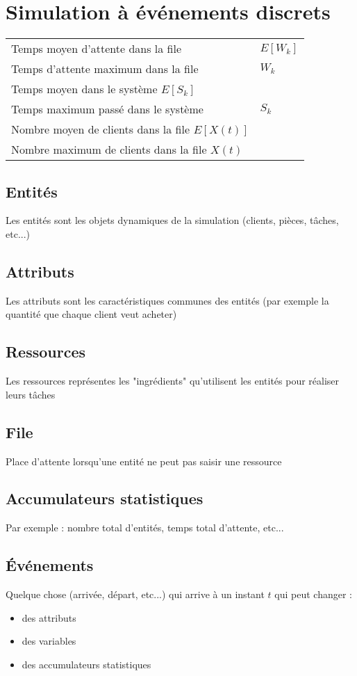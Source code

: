 \documentclass[resume]{subfiles}
\begin{document}
\section{Simulation à événements discrets}
\begin{center}
\begin{tabular}{ll}
Temps moyen d'attente dans la file & $E[W_k]$\\
Temps d'attente maximum dans la file & $W_k$\\
Temps moyen dans le système $E[S_k]$\\
Temps maximum passé dans le système & $S_k$\\
Nombre moyen de clients dans la file $E[X(t)]$\\
Nombre maximum de clients dans la file $X(t)$\\
\end{tabular}
\end{center}
\subsection{Entités}
Les entités sont les objets dynamiques de la simulation (clients, pièces, tâches, etc...)
\subsection{Attributs}
Les attributs sont les caractéristiques communes des entités (par exemple la quantité que chaque client veut acheter)
\subsection{Ressources}
Les ressources représentes les "ingrédients" qu'utilisent les entités pour réaliser leurs tâches
\subsection{File}
Place d'attente lorsqu'une entité ne peut pas saisir une ressource
\subsection{Accumulateurs statistiques}
Par exemple : nombre total d'entités, temps total d'attente, etc...
\subsection{Événements}
Quelque chose (arrivée, départ, etc...) qui arrive à un instant $t$ qui peut changer :
\begin{itemize}
\item des attributs
\item des variables
\item des accumulateurs statistiques
\end{itemize}
\end{document}
